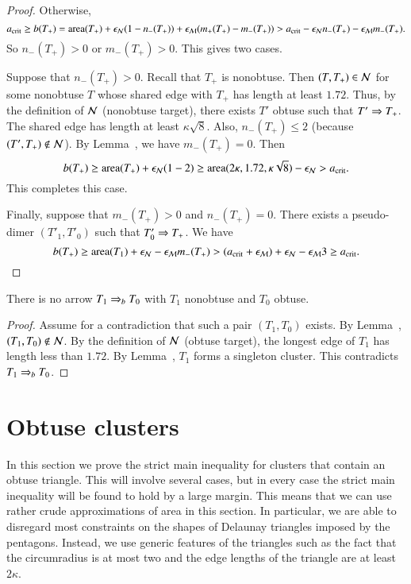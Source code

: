 \begin{proof}  Otherwise,
\[
a_\text{crit} \ge b(T_+) 
= {\operatorname{area}}(T_+) + \epsilon_{\mathcal N} (1 - n_-(T_+)) + \epsilon_{\mathcal M} (m_+(T_+)-m_-(T_+)) 
> a_\text{crit} - \epsilon_{\mathcal N} n_-(T_+) - \epsilon_{\mathcal M} m_-(T_+).
\]
So $n_-(T_+) > 0$ or $m_-(T_+)>0$. This gives two cases.  

Suppose that $n_-(T_+) >0$.  Recall that $T_+$ is nonobtuse.  Then
$(T,T_+)\in\mathcal N$ for some nonobtuse $T$ whose shared edge with $T_+$ has
length at least $1.72$.  Thus, by the definition of $\mathcal N$ (nonobtuse
target), there exists $T'$ obtuse such that $T'\Rightarrow T_+$.  The shared
edge has length at least $\kappa\sqrt8$.  Also, $n_-(T_+)\le 2$
(because $(T',T_+)\not\in \mathcal N$).  By Lemma~, we have
$m_-(T_+)=0$.  Then
\[
b(T_+) \ge {\operatorname{area}}(T_+) + \epsilon_{\mathcal N} (1 - 2) \ge {\operatorname{area}} (2\kappa,1.72,\kappa\sqrt8) - \epsilon_{\mathcal N} > a_\text{crit}.
\]
This completes this case.

Finally, suppose that $m_-(T_+)>0$ and $n_-(T_+)=0$.  There exists a pseudo-dimer $(T'_1,T'_0)$ such that $T'_0\Rightarrow T_+$.
We have
\[
b(T_+) \ge {\operatorname{area}}(T_1)+\epsilon_{\mathcal N} - \epsilon_{\mathcal M} m_-(T_+) 
> (a_\text{crit} + \epsilon_{\mathcal M}) + \epsilon_{\mathcal N} -\epsilon_{\mathcal M}  3 \ge a_\text{crit}.
\]
\end{proof}



\begin{lemma} 
  There is no arrow $T_1 \Rightarrow_{b} T_0$ with $T_1$ nonobtuse and $T_0$
  obtuse.
\end{lemma}

\begin{proof}  
  Assume for a contradiction that such a pair $(T_1,T_0)$ exists.  By
  Lemma~, $(T_1,T_0)\not\in\mathcal N$.  By the definition of
  $\mathcal N$ (obtuse target), the longest edge of $T_1$ has length less than
  $1.72$.  By Lemma~, $T_1$ forms a singleton
  cluster.  This contradicts $T_1\Rightarrow_{b} T_0$.
\end{proof}


\section{Obtuse clusters}

In this section we prove the strict main inequality for clusters that
contain an obtuse triangle.  This will involve several cases, but in
every case the strict main inequality will be found to hold by a large
margin.  This means that we can use rather crude approximations of
area in this section.  In particular, we are able to disregard most
constraints on the shapes of Delaunay triangles imposed by the
pentagons.  Instead, we use generic features of the triangles such as
the fact that the circumradius is at most two and the edge lengths of
the triangle are at least $2\kappa$.


